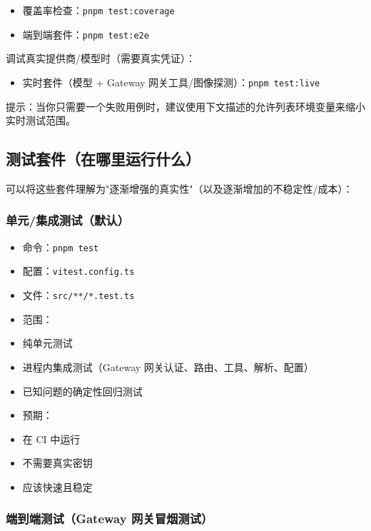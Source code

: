 \begin{itemize}
  \item 覆盖率检查：\texttt{pnpm test:coverage}
  \item 端到端套件：\texttt{pnpm test:e2e}
\end{itemize}


调试真实提供商/模型时（需要真实凭证）：

\begin{itemize}
  \item 实时套件（模型 + Gateway 网关工具/图像探测）：\texttt{pnpm test:live}
\end{itemize}


提示：当你只需要一个失败用例时，建议使用下文描述的允许列表环境变量来缩小实时测试范围。

\subsection{测试套件（在哪里运行什么）}


可以将这些套件理解为"逐渐增强的真实性"（以及逐渐增加的不稳定性/成本）：

\subsubsection{单元/集成测试（默认）}


\begin{itemize}
  \item 命令：\texttt{pnpm test}
  \item 配置：\texttt{vitest.config.ts}
  \item 文件：\texttt{src/**/*.test.ts}
  \item 范围：
  \item 纯单元测试
  \item 进程内集成测试（Gateway 网关认证、路由、工具、解析、配置）
  \item 已知问题的确定性回归测试
  \item 预期：
  \item 在 CI 中运行
  \item 不需要真实密钥
  \item 应该快速且稳定
\end{itemize}


\subsubsection{端到端测试（Gateway 网关冒烟测试）}


